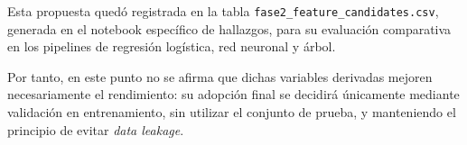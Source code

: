 Esta propuesta quedó registrada en la tabla \texttt{fase2\_feature\_candidates.csv}, generada en el notebook específico de hallazgos, para su evaluación comparativa en los pipelines de regresión logística, red neuronal y árbol.

Por tanto, en este punto no se afirma que dichas variables derivadas mejoren necesariamente el rendimiento: su adopción final se decidirá únicamente mediante validación en entrenamiento, sin utilizar el conjunto de prueba, y manteniendo el principio de evitar \textit{data leakage}.
